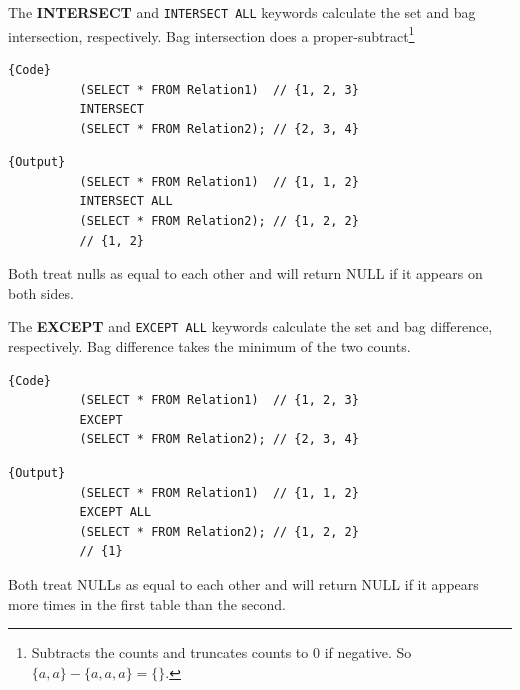     \begin{definition}[Intersection]
      \label{def:intersection-2}
      The \textbf{INTERSECT} and \texttt{INTERSECT ALL} keywords calculate the set and bag intersection, respectively. Bag intersection does a proper-subtract\footnote{Subtracts the counts and truncates counts to $0$ if negative. So $\{a, a\} - \{a, a, a\} = \{\}$.} 

      \noindent\begin{minipage}{.5\textwidth}
        \begin{lstlisting}[]{Code}
          (SELECT * FROM Relation1)  // {1, 2, 3}
          INTERSECT 
          (SELECT * FROM Relation2); // {2, 3, 4}
        \end{lstlisting}
        \end{minipage}
        \hfill
        \begin{minipage}{.49\textwidth}
        \begin{lstlisting}[]{Output}
          (SELECT * FROM Relation1)  // {1, 1, 2}
          INTERSECT ALL 
          (SELECT * FROM Relation2); // {1, 2, 2}
          // {1, 2}
        \end{lstlisting}
      \end{minipage}
      Both treat nulls as equal to each other and will return NULL if it appears on both sides. 
    \end{definition}

    \begin{definition}[Difference]
      \label{def:difference-2}
      The \textbf{EXCEPT} and \texttt{EXCEPT ALL} keywords calculate the set and bag difference, respectively. Bag difference takes the minimum of the two counts. 

      \noindent\begin{minipage}{.5\textwidth}
        \begin{lstlisting}[]{Code}
          (SELECT * FROM Relation1)  // {1, 2, 3}
          EXCEPT 
          (SELECT * FROM Relation2); // {2, 3, 4}
        \end{lstlisting}
        \end{minipage}
        \hfill
        \begin{minipage}{.49\textwidth}
        \begin{lstlisting}[]{Output}
          (SELECT * FROM Relation1)  // {1, 1, 2}
          EXCEPT ALL 
          (SELECT * FROM Relation2); // {1, 2, 2}
          // {1}
        \end{lstlisting}
      \end{minipage}
      Both treat NULLs as equal to each other and will return NULL if it appears more times in the first table than the second. 
    \end{definition}

